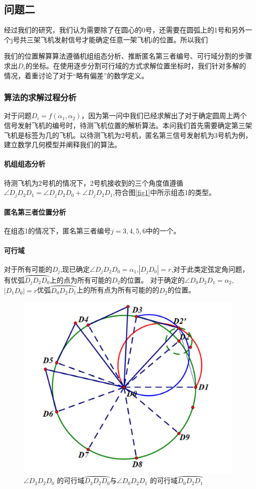 \documentclass[withoutpreface,bwprint]{cumcmthesis} %
\begin{document}
		\subsection{问题二}
			经过我们的研究，我们认为需要除了在圆心的0号，还需要在圆弧上的1号和另外一个j号共三架飞机发射信号才能确定任意一架飞机i的位置。所以我们
			
			
			我们的位置解算算法遵循机组组态分析、推断匿名第三者编号、可行域分割的步骤求出$D_i$的坐标。在使用逐步分割可行域的方式求解位置坐标时，我们针对多解的情况，着重讨论了对于“略有偏差”的数学定义。
			\subsubsection{算法的求解过程分析}
			对于问题$D_i = f(\alpha_1, \alpha_2)$，因为第一问中我们已经求解出了对于确定圆周上两个信号发射飞机的编号时，待测飞机位置的解析算法。本问我们首先需要确定第三架飞机是标签为几的飞机。以待测飞机为2号机，匿名第三信号发射机为3号机为例，建立数学几何模型并阐释我们的算法。
			\paragraph{机组组态分析}
			待测飞机为2号机的情况下，2号机接收到的三个角度值遵循$\angle D_jD_2D_1 =\angle D_jD_2D_0 + \angle D_jD_2D_1$,符合图\ref{fig1}中所示组态1的类型。
			\paragraph{匿名第三者位置分析}
			在组态1的情况下，匿名第三者编号$j=3,4,5,6$中的一个。
			\paragraph{可行域}
			对于所有可能的$D_j$,现已确定$\angle D_jD_2D_0 = \alpha_1$,$|D_jD_0|= r$,对于此类定弦定角问题，有优弧$\wideparen{D_jD_2D_0}$上的点为所有可能的$D_2$的位置。
			对于确定的$\angle D_0D_2D_1 = \alpha_2$,$|D_1D_0|= r$优弧$\wideparen{D_0D_2D_1}$上的所有点为所有可能的的$D_2$的位置。
			\begin{figure}[htb]
				\centering
				\includegraphics[width=0.5\linewidth]{./figures/3}
				\caption{$\angle D_3D_2D_0$ 的可行域$\wideparen{D_3D_2D_0}$与$\angle D_0D_2D_1$ 的可行域$\wideparen{D_0D_2D_1}$}
				\label{fig3}
			\end{figure}
		
\end{document}
